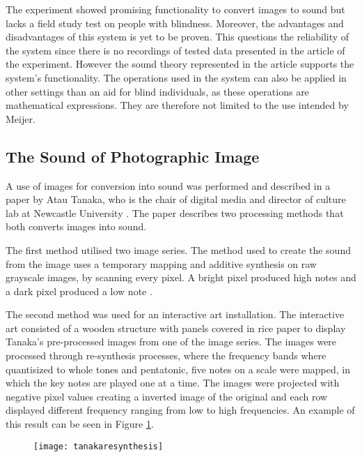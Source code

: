The experiment showed promising functionality to convert images to sound but lacks a field study test on people with blindness. Moreover, the advantages and disadvantages of this system is yet to be proven. This questions the reliability of the system since there is no recordings of tested data presented in the article of the experiment. However the sound theory represented in the article supports the system's functionality. The operations used in the system can also be applied in other settings than an aid for blind individuals, as these operations are mathematical expressions. They are therefore not limited to the use intended by Meijer.

\subsection{The Sound of Photographic Image}\label{sec:soundarticle}

A use of images for conversion into sound was performed and described in a paper by Atau Tanaka, who is the chair of digital media and director of culture lab at Newcastle University \cite{Tanaka2012}. The paper describes two processing methods that both converts images into sound.

The first method utilised two image series. The method used to create the sound from the image uses a temporary mapping and additive synthesis on raw grayscale images, by scanning every pixel. A bright pixel produced high notes and a dark pixel produced a low note \cite{Tanaka2012}.

The second method was used for an interactive art installation. The interactive art consisted of a wooden structure with panels covered in rice paper to display Tanaka's pre-processed images from one of the image series. The images were processed through re-synthesis processes, where the frequency bands where quantisized to whole tones and pentatonic, five notes on a scale were mapped, in which the key notes are played one at a time. The images were projected with negative pixel values creating a inverted image of the original and each row displayed different frequency ranging from low to high frequencies. An example of this result can be seen in Figure \ref{fig:tanakaresynthesis}.  

\begin{figure}[!h]
\centering
\texttt{[image: tanakaresynthesis]}
\caption{\label{fig:tanakaresynthesis}\cite{Tanaka2012}}
\end{figure}

